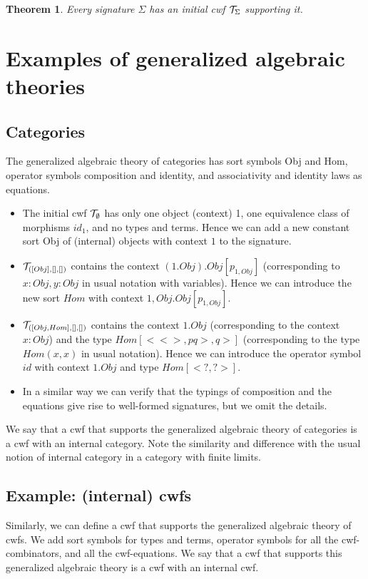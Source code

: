 \documentclass{lmcs}
\newtheorem{theorem}{Theorem}
\begin{document}
\begin{theorem}
Every signature $\Sigma$ has an initial cwf ${\mathcal T}_\Sigma$ supporting it.
\end{theorem}

\section{Examples of generalized algebraic theories}

\subsection{Categories} The generalized algebraic theory of categories has sort symbols Obj and Hom, operator symbols composition and identity, and associativity and identity laws as equations. 
\begin{itemize}
\item The initial cwf ${\mathcal T}_\emptyset$ has only one object (context) 1, one equivalence class of morphisms $id_1$, and no types and terms. Hence we can add a new constant sort Obj of (internal) objects with context $1$ to the signature. 
\item ${\mathcal T}_{([Obj],[],[])}$ contains the context $(1.Obj).Obj[p_{1,Obj}]$ (corresponding to $x : Obj, y : Obj$ in usual notation with variables). Hence we can introduce the new sort $Hom$ with context $1,Obj.Obj[p_{1,Obj}]$.
\item ${\mathcal T}_{([Obj, Hom],[],[])}$ contains the context $1.Obj$ (corresponding to the context $x : Obj$) and the type $Hom[<<>,pq>,q>]$ (corresponding to the type $Hom(x,x)$ in usual notation). Hence we can introduce the operator symbol $id$ with context $1.Obj$ and type $Hom[<?,?>]$.
\item In a similar way we can verify that the typings of composition and the equations give rise to well-formed signatures, but we omit the details.
\end{itemize}

We say that a cwf that supports the generalized algebraic theory of categories is a cwf with an internal category. Note the similarity and difference with the usual notion of internal category in a category with finite limits.

\subsection{Example: (internal) cwfs} Similarly, we can define a cwf that supports the generalized algebraic theory of cwfs. We add sort symbols for types and terms, operator symbols for all the cwf-combinators, and all the cwf-equations. We say that a cwf that supports this generalized algebraic theory is a cwf with an internal cwf.
\end{document}
